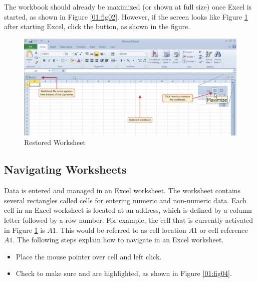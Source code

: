 The workbook should already be maximized (or shown at full size) once Excel is started, as shown in Figure \ref{01:fig02}. However, if the screen looks like Figure \ref{01:fig03} after starting Excel, click the  button, as shown in the figure.

\begin{figure}[H]
	\centering
	\includegraphics[width=\maxwidth{.95\linewidth}]{gfx/ch01_fig03}
	\caption{Restored Worksheet}
	\label{01:fig03}
\end{figure}

\subsection{Navigating Worksheets}

Data is entered and managed in an Excel worksheet. The worksheet contains several rectangles called cells for entering numeric and non-numeric data. Each cell in an Excel worksheet is located at an address, which is defined by a column letter followed by a row number. For example, the cell that is currently activated in Figure \ref{01:fig03} is $ A1 $. This would be referred to as cell location $ A1 $ or cell reference $ A1 $. The following steps explain how to navigate in an Excel worksheet.

\begin{itemize}
	\item Place the mouse pointer over cell  and left click.
	\item Check to make sure  and  are highlighted, as shown in Figure \ref{01:fig04}.
\end{itemize}

